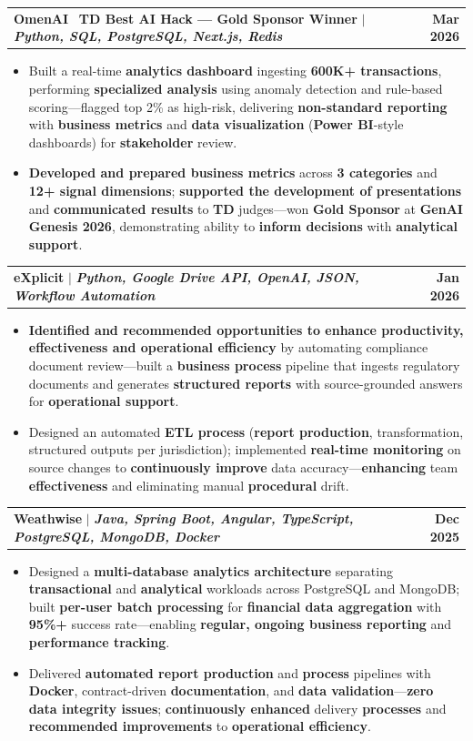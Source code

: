 \documentclass[letterpaper,10pt]{article}
\makeatletter
\newcommand{\resumeItem}[1]{
  \item\small{
    {#1 \vspace{-1pt}}
  }
}
\newcommand{\resumeProjectHeading}[2]{
    \item
    \begin{tabular*}{1.001\textwidth}{l@{\extracolsep{\fill}}r}
      \small#1 & \textbf{\small #2}\\
    \end{tabular*}\vspace{-9pt}
}
\newcommand{\resumeItemListStart}{\begin{itemize}[leftmargin=0.15in]}
\newcommand{\resumeItemListEnd}{\end{itemize}\vspace{-4pt}}
\makeatother
\begin{document}
    \resumeProjectHeading
          {\textbf{OmenAI} \textbar\ \textbf{TD Best AI Hack --- Gold Sponsor Winner} $|$ \emph{\textbf{Python, SQL, PostgreSQL, Next.js, Redis}}}{Mar 2026}
    \resumeItemListStart
    \resumeItem{Built a real-time \textbf{analytics dashboard} ingesting \textbf{600K+ transactions}, performing \textbf{specialized analysis} using anomaly detection and rule-based scoring---flagged top 2\% as high-risk, delivering \textbf{non-standard reporting} with \textbf{business metrics} and \textbf{data visualization} (\textbf{Power BI}-style dashboards) for \textbf{stakeholder} review.}
    \vspace{-2pt}
    \resumeItem{\textbf{Developed and prepared business metrics} across \textbf{3 categories} and \textbf{12+ signal dimensions}; \textbf{supported the development of presentations} and \textbf{communicated results} to \textbf{TD} judges---won \textbf{Gold Sponsor} at \textbf{GenAI Genesis 2026}, demonstrating ability to \textbf{inform decisions} with \textbf{analytical support}.}
          \resumeItemListEnd 
          \vspace{-18pt}

      \resumeProjectHeading
          {\textbf{eXplicit} $|$ \emph{\textbf{Python, Google Drive API, OpenAI, JSON, Workflow Automation}}}{Jan 2026}
          \resumeItemListStart
            \resumeItem{\textbf{Identified and recommended opportunities to enhance productivity, effectiveness and operational efficiency} by automating compliance document review---built a \textbf{business process} pipeline that ingests regulatory documents and generates \textbf{structured reports} with source-grounded answers for \textbf{operational support}.}
            \vspace{-2pt}
            \resumeItem{Designed an automated \textbf{ETL process} (\textbf{report production}, transformation, structured outputs per jurisdiction); implemented \textbf{real-time monitoring} on source changes to \textbf{continuously improve} data accuracy---\textbf{enhancing} team \textbf{effectiveness} and eliminating manual \textbf{procedural} drift.}
          \resumeItemListEnd
          \vspace{-18pt}

      \resumeProjectHeading
{\textbf{Weathwise} $|$ \emph{\textbf{Java, Spring Boot, Angular, TypeScript, PostgreSQL, MongoDB, Docker}}}{Dec 2025}
\resumeItemListStart
    \resumeItem{Designed a \textbf{multi-database analytics architecture} separating \textbf{transactional} and \textbf{analytical} workloads across PostgreSQL and MongoDB; built \textbf{per-user batch processing} for \textbf{financial data aggregation} with \textbf{95\%+} success rate---enabling \textbf{regular, ongoing business reporting} and \textbf{performance tracking}.}
    \vspace{-2pt}
    \resumeItem{Delivered \textbf{automated report production} and \textbf{process} pipelines with \textbf{Docker}, contract-driven \textbf{documentation}, and \textbf{data validation}---\textbf{zero data integrity issues}; \textbf{continuously enhanced} delivery \textbf{processes} and \textbf{recommended improvements} to \textbf{operational efficiency}.}
\resumeItemListEnd
          \vspace{-8pt}
          
\end{document}
